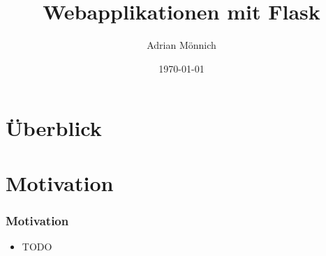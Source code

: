 \documentclass{beamer}
\date{\today}
\title{Webapplikationen mit Flask}
\author{Adrian Mönnich}
\institute[Hochschule Karlsruhe]{
  Fakultät für Informatik und Wirtschaftsinformatik\\
  Hochschule Karlsruhe
}
\begin{document}
\maketitle
\section*{Überblick}
\frame{\tableofcontents}

\section{Motivation}
\begin{frame}
  \frametitle{Motivation}
  \begin{itemize}
    \item TODO
  \end{itemize}
\end{frame}
\end{document}
